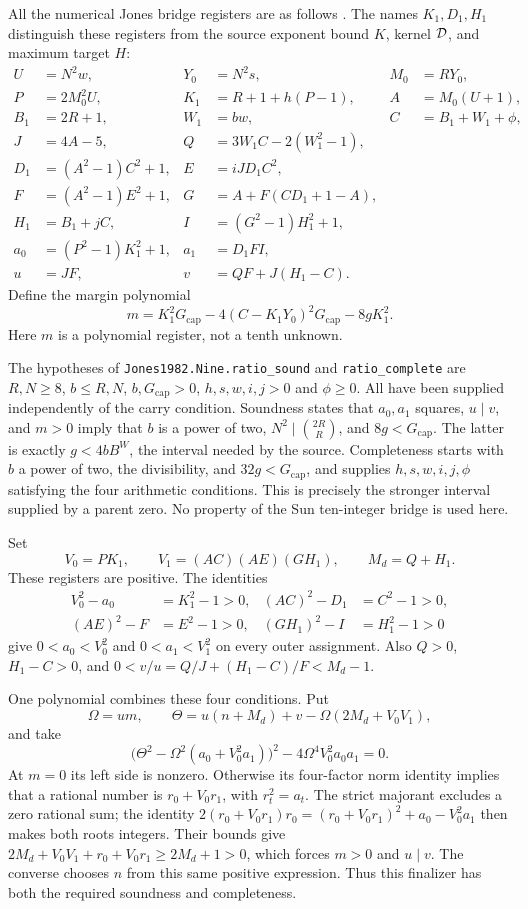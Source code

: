 All the numerical Jones bridge registers are as follows
\cite{package45,jones}. The names $K_1,D_1,H_1$ distinguish these
registers from the source exponent bound $K$, kernel $\mathcal D$, and maximum
target $H$:
\begin{align*}
U&=N^2w,&Y_0&=N^2s,&M_0&=RY_0,\\
P&=2M_0^2U,&K_1&=R+1+h(P-1),&A&=M_0(U+1),\\
B_1&=2R+1,&W_1&=bw,&C&=B_1+W_1+\phi,\\
J&=4A-5,&Q&=3W_1C-2(W_1^2-1),&&\\
D_1&=(A^2-1)C^2+1,&E&=iJD_1C^2,&&\\
F&=(A^2-1)E^2+1,&G&=A+F(CD_1+1-A),&&\\
H_1&=B_1+jC,&I&=(G^2-1)H_1^2+1,&&\\
a_0&=(P^2-1)K_1^2+1,&a_1&=D_1FI,&&\\
u&=JF,&v&=QF+J(H_1-C).&&
\end{align*}
Define the margin polynomial
\[
m=K_1^2G_{\mathrm{cap}}
 -4(C-K_1Y_0)^2G_{\mathrm{cap}}-8gK_1^2.
\]
Here $m$ is a polynomial register, not a tenth unknown.

The hypotheses of \texttt{Jones1982.Nine.ratio\_sound} and
\texttt{ratio\_complete} are $R,N\geq8$, $b\leq R,N$,
$b,G_{\mathrm{cap}}>0$, $h,s,w,i,j>0$ and $\phi\geq0$.
All have been supplied independently of the carry condition.
Soundness states that $a_0,a_1$ squares, $u\mid v$, and $m>0$ imply
that $b$ is a power of two, $N^2\mid\binom{2R}{R}$, and
$8g<G_{\mathrm{cap}}$. The latter is exactly $g<4bB^W$, the
interval needed by the source. Completeness starts with $b$ a power
of two, the divisibility, and $32g<G_{\mathrm{cap}}$, and supplies
$h,s,w,i,j,\phi$ satisfying the four arithmetic conditions.
This is precisely the stronger interval supplied by a parent zero.
No property of the Sun ten-integer bridge is used here.

Set
\[
V_0=PK_1,\qquad V_1=(AC)(AE)(GH_1),\qquad M_d=Q+H_1.
\]
These registers are positive. The identities
\begin{align*}
V_0^2-a_0&=K_1^2-1>0,&(AC)^2-D_1&=C^2-1>0,\\
(AE)^2-F&=E^2-1>0,&(GH_1)^2-I&=H_1^2-1>0
\end{align*}
give $0<a_0<V_0^2$ and $0<a_1<V_1^2$ on every outer assignment.
Also $Q>0$, $H_1-C>0$, and
$0<v/u=Q/J+(H_1-C)/F<M_d-1$.

One polynomial combines these four conditions. Put
\[
\Omega=um,\qquad
\Theta=u(n+M_d)+v-\Omega(2M_d+V_0V_1),
\]
and take
\[
\boxed{\bigl(\Theta^2-\Omega^2(a_0+V_0^2a_1)\bigr)^2
       -4\Omega^4V_0^2a_0a_1=0.}
\]
At $m=0$ its left side is nonzero. Otherwise its four-factor norm identity
implies that a rational number is $r_0+V_0r_1$, with $r_t^2=a_t$.
The strict majorant excludes a zero rational sum; the identity
$2(r_0+V_0r_1)r_0=(r_0+V_0r_1)^2+a_0-V_0^2a_1$ then makes both roots
integers. Their bounds give
$2M_d+V_0V_1+r_0+V_0r_1\geq2M_d+1>0$, which forces $m>0$ and
$u\mid v$.  The converse chooses $n$ from this same positive expression.
Thus this finalizer has both the required soundness and completeness.

